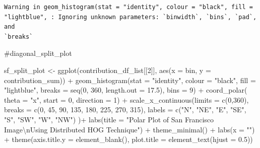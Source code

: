 \documentclass[
  letterpaper,
  DIV=11,
  numbers=noendperiod]{scrreprt}
\newenvironment{Shaded}{\begin{snugshade}}{\end{snugshade}}
\newcommand{\AttributeTok}[1]{\textcolor[rgb]{0.40,0.45,0.13}{#1}}
\newcommand{\CommentTok}[1]{\textcolor[rgb]{0.37,0.37,0.37}{#1}}
\newcommand{\DecValTok}[1]{\textcolor[rgb]{0.68,0.00,0.00}{#1}}
\newcommand{\FloatTok}[1]{\textcolor[rgb]{0.68,0.00,0.00}{#1}}
\newcommand{\FunctionTok}[1]{\textcolor[rgb]{0.28,0.35,0.67}{#1}}
\newcommand{\NormalTok}[1]{\textcolor[rgb]{0.00,0.23,0.31}{#1}}
\newcommand{\OtherTok}[1]{\textcolor[rgb]{0.00,0.23,0.31}{#1}}
\newcommand{\SpecialCharTok}[1]{\textcolor[rgb]{0.37,0.37,0.37}{#1}}
\newcommand{\StringTok}[1]{\textcolor[rgb]{0.13,0.47,0.30}{#1}}
\begin{document}
\begin{verbatim}
Warning in geom_histogram(stat = "identity", colour = "black", fill =
"lightblue", : Ignoring unknown parameters: `binwidth`, `bins`, `pad`, and
`breaks`
\end{verbatim}

\begin{Shaded}
\begin{Highlighting}[]
\CommentTok{\#diagonal\_split\_plot}
\end{Highlighting}
\end{Shaded}

\begin{Shaded}
\begin{Highlighting}[]
\NormalTok{sf\_split\_plot }\OtherTok{\textless{}{-}}
  \FunctionTok{ggplot}\NormalTok{(contribution\_df\_list[[}\DecValTok{2}\NormalTok{]], }
         \FunctionTok{aes}\NormalTok{(}\AttributeTok{x =}\NormalTok{ bin, }\AttributeTok{y =}\NormalTok{ contribution\_sum)) }\SpecialCharTok{+}
  \FunctionTok{geom\_histogram}\NormalTok{(}\AttributeTok{stat =} \StringTok{"identity"}\NormalTok{,}
                 \AttributeTok{colour =} \StringTok{"black"}\NormalTok{, }
                 \AttributeTok{fill =} \StringTok{"lightblue"}\NormalTok{, }
                 \AttributeTok{breaks =} \FunctionTok{seq}\NormalTok{(}\DecValTok{0}\NormalTok{, }\DecValTok{360}\NormalTok{, }\AttributeTok{length.out =} \FloatTok{17.5}\NormalTok{),}
                 \AttributeTok{bins =} \DecValTok{9}\NormalTok{) }\SpecialCharTok{+}
  \FunctionTok{coord\_polar}\NormalTok{(}
    \AttributeTok{theta =} \StringTok{"x"}\NormalTok{, }\AttributeTok{start =} \DecValTok{0}\NormalTok{, }\AttributeTok{direction =} \DecValTok{1}\NormalTok{) }\SpecialCharTok{+}
  \FunctionTok{scale\_x\_continuous}\NormalTok{(}\AttributeTok{limits =} \FunctionTok{c}\NormalTok{(}\DecValTok{0}\NormalTok{,}\DecValTok{360}\NormalTok{),}
    \AttributeTok{breaks =} \FunctionTok{c}\NormalTok{(}\DecValTok{0}\NormalTok{, }\DecValTok{45}\NormalTok{, }\DecValTok{90}\NormalTok{, }\DecValTok{135}\NormalTok{, }\DecValTok{180}\NormalTok{, }\DecValTok{225}\NormalTok{, }\DecValTok{270}\NormalTok{, }\DecValTok{315}\NormalTok{), }
    \AttributeTok{labels =} \FunctionTok{c}\NormalTok{(}\StringTok{"N"}\NormalTok{, }\StringTok{"NE"}\NormalTok{, }\StringTok{"E"}\NormalTok{, }\StringTok{"SE"}\NormalTok{, }\StringTok{"S"}\NormalTok{, }\StringTok{"SW"}\NormalTok{, }\StringTok{"W"}\NormalTok{, }\StringTok{"NW"}\NormalTok{)}
\NormalTok{  )}\SpecialCharTok{+}
  \FunctionTok{labs}\NormalTok{(}\AttributeTok{title =} \StringTok{"Polar Plot of San Francisco Image}\SpecialCharTok{\textbackslash{}n}\StringTok{Using Distributed HOG Technique"}\NormalTok{) }\SpecialCharTok{+}
  \FunctionTok{theme\_minimal}\NormalTok{() }\SpecialCharTok{+}
  \FunctionTok{labs}\NormalTok{(}\AttributeTok{x =} \StringTok{""}\NormalTok{) }\SpecialCharTok{+}
  \FunctionTok{theme}\NormalTok{(}\AttributeTok{axis.title.y =} \FunctionTok{element\_blank}\NormalTok{(),}
        \AttributeTok{plot.title =} \FunctionTok{element\_text}\NormalTok{(}\AttributeTok{hjust =} \FloatTok{0.5}\NormalTok{))}
\end{Highlighting}
\end{Shaded}
\end{document}
